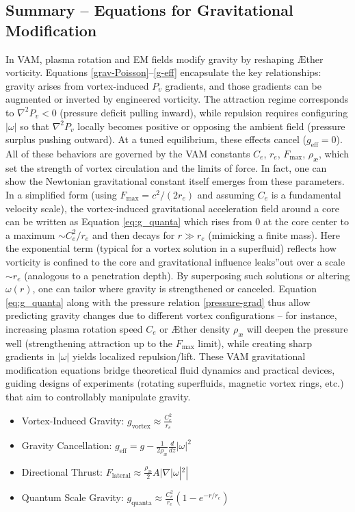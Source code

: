 \documentclass[a4paper,12pt]{article}
\begin{document}
\subsection*{Summary – Equations for Gravitational Modification}
In VAM, plasma rotation and EM fields modify gravity by reshaping Æther vorticity. Equations \eqref{grav-Poisson}–\eqref{g-eff} encapsulate the key relationships: gravity arises from vortex-induced $P_v$ gradients, and those gradients can be augmented or inverted by engineered vorticity. The attraction regime corresponds to $\nabla^2 P_v < 0$ (pressure deficit pulling inward), while repulsion requires configuring $|\omega|$ so that $\nabla^2 P_v$ locally becomes positive or opposing the ambient field (pressure surplus pushing outward). At a tuned equilibrium, these effects cancel ($g_{\text{eff}}=0$). All of these behaviors are governed by the VAM constants $C_e$, $r_e$, $F_{\max}$, $\rho_\text{\ae}$, which set the strength of vortex circulation and the limits of force. In fact, one can show the Newtonian gravitational constant itself emerges from these parameters. In a simplified form (using $F_{\max}=c^2/(2r_e)$ and assuming $C_e$ is a fundamental velocity scale), the vortex-induced gravitational acceleration field around a core can be written as Equation \eqref{eq:g_quanta} which rises from 0 at the core center to a maximum $\sim C_e^2/r_e$ and then decays for $r \gg r_e$ (mimicking a finite mass). Here the exponential term (typical for a vortex solution in a superfluid) reflects how vorticity is confined to the core and gravitational influence \grqq leaks\textquotedblright out over a scale $\sim r_e$ (analogous to a penetration depth). By superposing such solutions or altering $\omega(r)$, one can tailor where gravity is strengthened or canceled. Equation \eqref{eq:g_quanta} along with the pressure relation \eqref{pressure-grad} thus allow predicting gravity changes due to different vortex configurations – for instance, increasing plasma rotation speed $C_e$ or Æther density $\rho_\text{\ae}$ will deepen the pressure well (strengthening attraction up to the $F_{\max}$ limit), while creating sharp gradients in $|\omega|$ yields localized repulsion/lift. These VAM gravitational modification equations bridge theoretical fluid dynamics and practical devices, guiding designs of experiments (rotating superfluids, magnetic vortex rings, etc.) that aim to controllably manipulate gravity.


\begin{itemize}
    \item Vortex-Induced Gravity: $g_\text{vortex} \approx \frac{C_e^2}{r_e}$
    \item Gravity Cancellation: $g_\text{eff} = g - \frac{1}{2 \rho_\text{\ae}} \frac{d}{dz} |\omega|^2$
    \item Directional Thrust: $F_\text{lateral} \approx \frac{\rho_\text{\ae}}{2} A |\nabla |\omega|^2|$
    \item Quantum Scale Gravity: $g_\text{quanta} \approx \frac{C_e^2}{r_e} (1 - e^{-r/r_e})$
\end{itemize}
\end{document}
